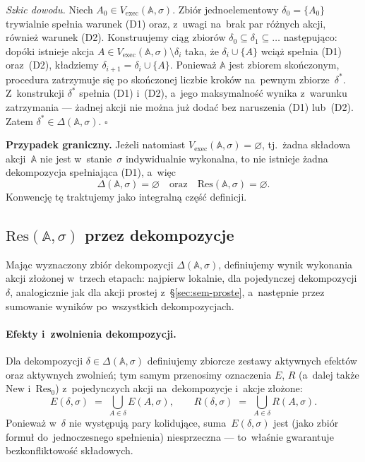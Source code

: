 \documentclass[11pt,a4paper]{article}
\theoremstyle{definition}
\begin{document}
\medskip
\noindent \textit{Szkic dowodu.}
Niech $A_0 \in V_{\mathrm{exec}}(\mathbb{A},\sigma)$. Zbiór jednoelementowy
$\delta_0 = \{A_0\}$ trywialnie spełnia warunek (D1) oraz, z~uwagi na~brak
par różnych akcji, również warunek (D2). Konstruujemy ciąg zbiorów
$\delta_0 \subseteq \delta_1 \subseteq \ldots$ następująco: dopóki
istnieje akcja $A \in V_{\mathrm{exec}}(\mathbb{A},\sigma) \setminus \delta_i$
taka, że $\delta_i \cup \{A\}$ wciąż spełnia (D1) oraz~(D2), kładziemy
$\delta_{i+1} = \delta_i \cup \{A\}$. Ponieważ $\mathbb{A}$ jest zbiorem
skończonym, procedura zatrzymuje się po skończonej liczbie kroków
na~pewnym zbiorze~$\delta^\ast$. Z~konstrukcji $\delta^\ast$ spełnia
(D1) i~(D2), a~jego maksymalność wynika z~warunku zatrzymania ---
żadnej akcji nie można już dodać bez naruszenia (D1) lub~(D2). Zatem
$\delta^\ast \in \Delta(\mathbb{A},\sigma)$. \hfill$\square$

\medskip
\noindent \textbf{Przypadek graniczny.}
Jeżeli natomiast $V_{\mathrm{exec}}(\mathbb{A},\sigma) = \varnothing$,
tj.\ żadna składowa akcji~$\mathbb{A}$ nie jest w~stanie~$\sigma$
indywidualnie wykonalna, to nie istnieje żadna dekompozycja spełniająca
(D1), a~więc
\[
  \Delta(\mathbb{A},\sigma) = \varnothing
  \quad\text{oraz}\quad
  \mathrm{Res}(\mathbb{A},\sigma) = \varnothing.
\]
Konwencję tę traktujemy jako integralną część definicji.

\subsection{\texorpdfstring{$\mathrm{Res}(\mathbb{A}, \sigma)$}{Res(A,sigma)} przez dekompozycje}
\label{sec:res-zlozone}

Mając wyznaczony zbiór dekompozycji $\Delta(\mathbb{A},\sigma)$,
definiujemy wynik wykonania akcji złożonej w~trzech etapach: najpierw
lokalnie, dla pojedynczej dekompozycji $\delta$, analogicznie jak dla
akcji prostej z~\S\ref{sec:sem-proste}, a~następnie przez sumowanie wyników po~wszystkich
dekompozycjach.

\paragraph{Efekty i~zwolnienia dekompozycji.}
Dla dekompozycji $\delta \in \Delta(\mathbb{A},\sigma)$ definiujemy
zbiorcze zestawy aktywnych efektów oraz aktywnych zwolnień; tym samym przenosimy
oznaczenia $E$, $R$ (a~dalej także $\mathrm{New}$ i~$\mathrm{Res}_0$) z~pojedynczych
akcji na~dekompozycje i~akcje złożone:
\[
  E(\delta,\sigma) \;=\; \bigcup_{A \in \delta} E(A,\sigma),
  \qquad
  R(\delta,\sigma) \;=\; \bigcup_{A \in \delta} R(A,\sigma).
\]
Ponieważ w~$\delta$ nie występują pary kolidujące, suma~$E(\delta,\sigma)$
jest (jako zbiór formuł do~jednoczesnego spełnienia) niesprzeczna ---
to~właśnie gwarantuje bezkonfliktowość składowych.
\end{document}
